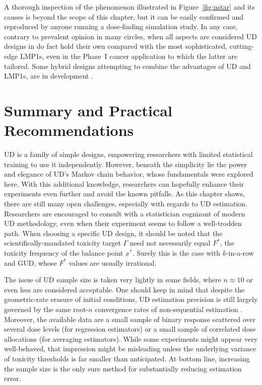 A thorough inspection of the phenomenon illustrated in Figure~\ref{fig:nstar} and its causes is beyond the scope of this chapter, but it can be easily confirmed and reproduced by anyone running a dose-finding simulation study. In any case, contrary to prevalent opinion in many circles, when all aspects are considered UD designs in do fact hold their own compared with the most sophisticated, cutting-edge LMP1s, even in the Phase~I cancer application to which the latter are tailored. Some hybrid designs attempting to combine the advantages of UD and LMP1s, are in development \citep[Ch.~5]{Oron07}.


\section{Summary and Practical Recommendations}\label{sec:summary}

UD is a family of simple designs, empowering researchers with limited statistical training to use it independently. However, beneath the simplicity lie the power and elegance of UD's Markov chain behavior, whose fundamentals were explored here. With this additional knowledge, researchers can hopefully enhance their experiments even further and avoid the known pitfalls. As this chapter shows, there are still many open challenges, especially with regards to UD estimation. Researchers are encouraged to consult with a statistician cognizant of modern UD methodology, even when their experiment seems to follow a well-trodden path. When choosing a specific UD design, it should be noted that the scientifically-mandated toxicity target $\Gamma$ need not necessarily equal $F^*$, the toxicity frequency of the balance point $x^*$. Surely this is the case with $k$-in-a-row and GUD, whose $F^*$ values are usually irrational.

The issue of UD sample size is taken very lightly in some fields, where $n\approx 10$ or even less are considered acceptable. One should keep in mind that despite the geometric-rate erasure of initial conditions, UD estimation precision is still largely governed by the same root-$n$ convergence rates of non-sequential estimation \citep[see ref. ][Section~1.2]{Oron07} . Moreover, the available data are a small sample of binary response scattered over several dose levels (for regression estimators) or a small sample of correlated dose allocations (for averaging estimators). While some experiments might appear very well-behaved, that impression might be misleading unless the underlying variance of toxicity thresholds is far smaller than anticipated. At bottom line, increasing the sample size is the only sure method for substantially reducing estimation error.

